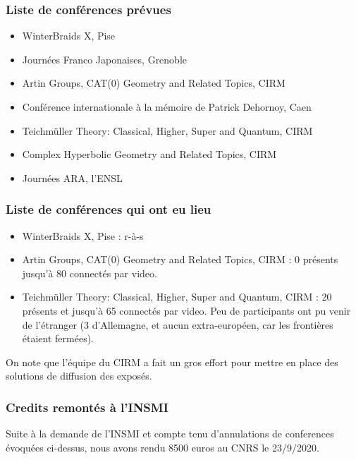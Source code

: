 \documentclass[]{article}
\providecommand{\tightlist}{%
  \setlength{\itemsep}{0pt}\setlength{\parskip}{0pt}}
\begin{document}
\subsubsection{Liste de conférences
prévues}\label{liste-de-confuxe9rences-pruxe9vues}

\begin{itemize}
\tightlist
\item
  WinterBraids X, Pise
\item
  Journées Franco Japonaises, Grenoble
\item
  Artin Groups, CAT(0) Geometry and Related Topics, CIRM
\item
  Conférence internationale à la mémoire de Patrick Dehornoy, Caen
\item
  Teichmüller Theory: Classical, Higher, Super and Quantum, CIRM
\item
  Complex Hyperbolic Geometry and Related Topics, CIRM
\item
  Journées ARA, l'ENSL
\end{itemize}

\subsubsection{Liste de conférences qui ont eu lieu}\label{liste-de-confuxe9rences-pruxe9vues2}

\begin{itemize}
\tightlist
\item
  WinterBraids X, Pise : r-à-s
\item
  Artin Groups, CAT(0) Geometry and Related Topics, CIRM 
  : 0 présents jusqu'à 80 connectés par video.
\item
  Teichmüller Theory: Classical, Higher, Super and Quantum, CIRM
    : 20 présents et jusqu'à 65 connectés par video.
Peu de participants ont pu venir de l’étranger (3 d’Allemagne, et aucun extra-européen, car les frontières étaient fermées).
\end{itemize}

On note que l'équipe du CIRM a fait un gros effort pour mettre en place des solutions de
diffusion des exposés.


\subsubsection{Credits remontés à
l'INSMI}\label{credits-remontuxe9s-uxe0-linsmi}

Suite à la demande de l'INSMI  et compte tenu d'annulations de conferences
évoquées ci-dessus, nous avons rendu 8500 euros au CNRS le
23/9/2020.
\end{document}
